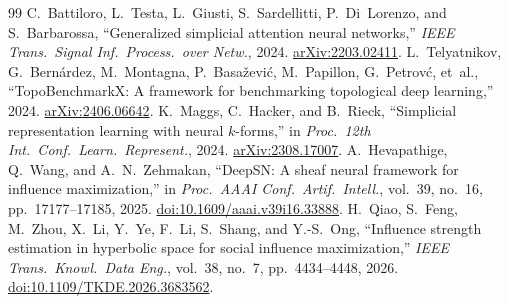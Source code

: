 \documentclass[a4paper,11pt,twocolumn]{ctexart}
\begin{document}
\begin{thebibliography}{99}
 C.~Battiloro, L.~Testa, L.~Giusti, S.~Sardellitti, P.~Di~Lorenzo, and S.~Barbarossa, ``Generalized simplicial attention neural networks,'' \emph{IEEE Trans.\ Signal Inf.\ Process.\ over Netw.}, 2024. \href{https://arxiv.org/abs/2203.02411}{arXiv:2203.02411}.
 L.~Telyatnikov, G.~Bern{\'a}rdez, M.~Montagna, P.~Basa{\v{z}}evi{\'c}, M.~Papillon, G.~Petrov{\'c}, et~al., ``TopoBenchmarkX: A framework for benchmarking topological deep learning,'' 2024. \href{https://arxiv.org/abs/2406.06642}{arXiv:2406.06642}.
 K.~Maggs, C.~Hacker, and B.~Rieck, ``Simplicial representation learning with neural $k$-forms,'' in \emph{Proc.\ 12th Int.\ Conf.\ Learn.\ Represent.}, 2024. \href{https://arxiv.org/abs/2308.17007}{arXiv:2308.17007}.
 A.~Hevapathige, Q.~Wang, and A.~N.~Zehmakan, ``DeepSN: A sheaf neural framework for influence maximization,'' in \emph{Proc.\ AAAI Conf.\ Artif.\ Intell.}, vol.~39, no.~16, pp.~17177--17185, 2025. \href{https://doi.org/10.1609/aaai.v39i16.33888}{doi:10.1609/aaai.v39i16.33888}.
 H.~Qiao, S.~Feng, M.~Zhou, X.~Li, Y.~Ye, F.~Li, S.~Shang, and Y.-S.~Ong, ``Influence strength estimation in hyperbolic space for social influence maximization,'' \emph{IEEE Trans.\ Knowl.\ Data Eng.}, vol.~38, no.~7, pp.~4434--4448, 2026. \href{https://doi.org/10.1109/TKDE.2026.3683562}{doi:10.1109/TKDE.2026.3683562}.
\end{thebibliography}
\end{document}

